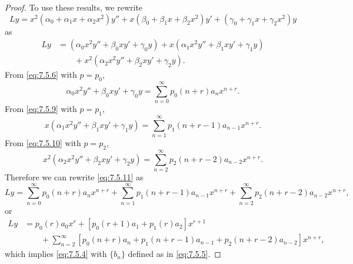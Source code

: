 \begin{proof}
To use these results, we rewrite
\[
Ly=
x^2(\alpha_0+\alpha_1x+\alpha_2x^2)y''+x(\beta_0+\beta_1x+\beta_2x^2)y'
+(\gamma_0+\gamma_1x+\gamma_2x^2)y
\]
 as
\begin{equation} \label{eq:7.5.11}
\begin{aligned}
Ly&=\left(\alpha_0x^2y''+\beta_0xy'+\gamma_0y\right) +
x\left(\alpha_1x^2y''+\beta_1xy'+\gamma_1y\right)\\
&\qquad{}+x^2\left(\alpha_2x^2y''+\beta_2xy'+\gamma_2y\right).
\end{aligned}
\end{equation}
From \eqref{eq:7.5.6} with $p=p_0$,
\[
\alpha_0x^2y''+\beta_0xy'+\gamma_0y=\sum_{n=0}^\infty
p_0(n+r)a_nx^{n+r}.
\]
From \eqref{eq:7.5.9} with $p=p_1$,
\[
x\left(\alpha_1x^2y''+\beta_1xy'+\gamma_1y\right)=\sum_{n=1}^\infty
p_1(n+r-1)a_{n-1}x^{n+r}.
\]
From \eqref{eq:7.5.10} with $p=p_2$,
\[
x^2\left(\alpha_2x^2y''+\beta_2xy'+\gamma_2y\right)=\sum_{n=2}^\infty
p_2(n+r-2)a_{n-2}x^{n+r}.
\]
Therefore we can rewrite \eqref{eq:7.5.11} as
\[
Ly=\sum_{n=0}^\infty p_0(n+r)a_nx^{n+r}+
\sum_{n=1}^\infty p_1(n+r-1)a_{n-1}x^{n+r}
+\sum_{n=2}^\infty p_2(n+r-2)a_{n-2}x^{n+r},
\]
or
\begin{align*}
Ly&= p_0(r)a_0x^r+\left[p_0(r+1)a_1+p_1(r)a_2\right]x^{r+1}\\
&\qquad{} +\sum_{n=2}^\infty\left[p_0(n+r)a_n+p_1(n+r-1)a_{n-1}
+p_2(n+r-2)a_{n-2}\right]x^{n+r},
\end{align*}
which implies \eqref{eq:7.5.4} with $\{b_n\}$ defined as in
\eqref{eq:7.5.5}.
\end{proof}

